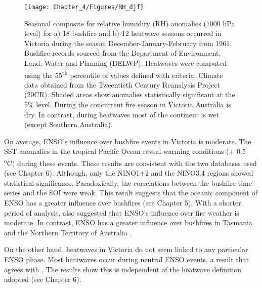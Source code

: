 \begin{figure}[h]
\noindent \begin{centering}
\texttt{[image: Chapter\_4/Figures/RH\_djf]}
\par\end{centering}

\caption[Seasonal composite for relative humidity (RH) anomalies (1000 hPa
level) for a) 18 bushfire and b) 12 heatwave seasons occurred in Victoria during the
season December-January-February from 1961]{Seasonal composite for relative humidity (RH) anomalies (1000 hPa
level) for a) 18 bushfire and b) 12 heatwave seasons occurred in Victoria during the
season December-January-February from 1961. Bushfire
records sourced from the Department of Environment, Land, Water and
Planning (DELWP). Heatwaves were computed using the 55\protect\textsuperscript{th}
percentile of values defined with \citet{Nairn2009} criteria. Climate
data obtained from the Tweentieth Century Reanalysis Project (20CR).
Shaded areas show anomalies statistically significant at the 5\% level.
During the concurrent fire season in Victoria Australia is dry. In
contrast, during heatwaves most of the continent is wet (except Southern
Australia). \label{fig: Relative humidity anomalies (1000 hPa level) of bushfire and heatwave seasons in December-January-February for the period 1961=0020132011}}


\end{figure}

On average, ENSO's influence over bushfire events in Victoria is moderate.
The SST anomalies in the tropical Pacific Ocean reveal warming conditions
(+ 0.5 \textsuperscript{o}C) during these events. These results are
consistent with the two databases used (see Chapter 6). Although,
only the NINO1+2 and the NINO3.4 regions showed statistical significance.
Paradoxically, the correlations between the bushfire time series and
the SOI were weak. This result suggests that the oceanic component
of ENSO has a greater influence over bushfires (see Chapter 5). With
a shorter period of analysis, \citet{Harris2013} also suggested that
ENSO's influence over fire weather is moderate. In contrast, ENSO
has a greater influence over bushfires in Tasmania \citep{Nicholls2007a} 
and the Northern Territory of Australia \citep{Harris2008}. 

On the other hand, heatwaves in Victoria do not seem linked to any
particular ENSO phase. Most heatwaves occur during neutral ENSO events,
a result that agrees with \citet{Boschat2014}. The results show this
is independent of the heatwave definition adopted (see Chapter 6). 

